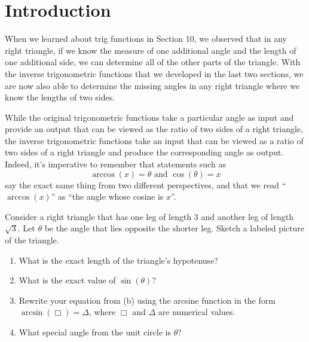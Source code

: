 \documentclass{ximera}
\begin{document}
\section{Introduction}
When we learned about trig functions in Section 10, we observed that in any right triangle, if we know the measure of one additional angle and the length of one additional side, we can determine all of the other parts of the triangle.  With the inverse trigonometric functions that we developed in the last two sections, we are now also able to determine the missing angles in any right triangle where we know the lengths of two sides.%
\par
While the original trigonometric functions take a particular angle as input and provide an output that can be viewed as the ratio of two sides of a right triangle, the inverse trigonometric functions take an input that can be viewed as a ratio of two sides of a right triangle and produce the corresponding angle as output. Indeed, it's imperative to remember that statements such as%
\begin{equation*}
\arccos(x) = \theta \text{ and } \cos(\theta) = x
\end{equation*}
say the exact same thing from two different perspectives, and that we read ``$\arccos(x)$'' as ``the angle whose cosine is $x$''.%
\begin{exploration}
%
Consider a right triangle that has one leg of length $3$ and another leg of length $\sqrt{3}$.  Let $\theta$ be the angle that lies opposite the shorter leg.  Sketch a labeled picture of the triangle.%
%
\begin{enumerate}
\item What is the exact length of the triangle's hypotenuse?
%
\item What is the exact value of $\sin(\theta)$?
%
\item Rewrite your equation from (b) using the arcsine function in the form $\arcsin(\Box) = \Delta$, where $\Box$ and $\Delta$ are numerical values.
%
\item What special angle from the unit circle is $\theta$?%
\end{enumerate}
\end{exploration}
\end{document}
